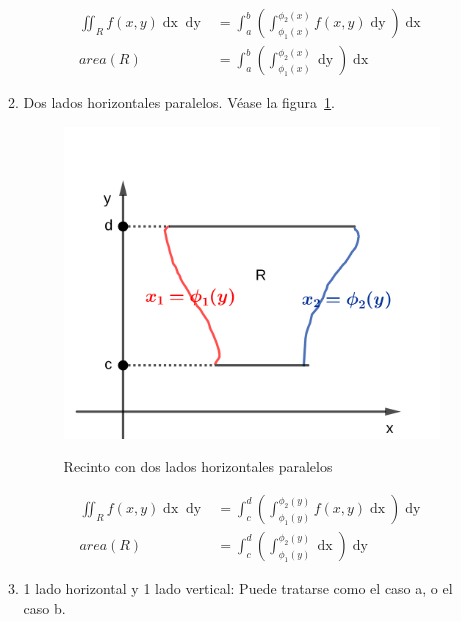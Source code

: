 \documentclass{article}
\begin{document}
\begin{enumerate}[(A)]
\begin{enumerate}
\begin{subequations}
\begin{align}
\iint_R f(x,y) \mathop{dx} \mathop{dy} &= \int_a^b \left( \int_{\phi_1(x)}^{\phi_2(x)} f(x,y) \mathop{dy} \right) \mathop{dx} \\
area(R) &= \int_a^b \left( \int_{\phi_1(x)}^{\phi_2(x)} \mathop{dy} \right) \mathop{dx}
\end{align}
\end{subequations}

\item Dos lados horizontales paralelos. Véase la figura~\ref{fig:d2}.

\begin{figure}[ht]
\centering
\caption{Recinto con dos lados horizontales paralelos}
\includegraphics[scale=0.75]{img/teo_fig026_d2.png}
\label{fig:d2}
\end{figure}

\begin{subequations}
\begin{align}
\iint_R f(x,y) \mathop{dx} \mathop{dy} &= \int_c^d \left( \int_{\phi_1(y)}^{\phi_2(y)} f(x,y) \mathop{dx} \right) \mathop{dy} \\
area(R) &= \int_c^d \left( \int_{\phi_1(y)}^{\phi_2(y)} \mathop{dx} \right) \mathop{dy}
\end{align}
\end{subequations}

\item 1 lado horizontal y 1 lado vertical: Puede tratarse como el caso a, o el caso b.
\end{enumerate}


\end{enumerate}
\end{document}
